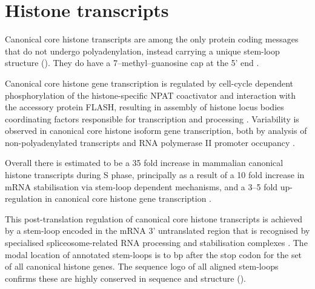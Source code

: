 \section{Histone transcripts}


  Canonical core histone transcripts are among the only protein coding messages
  that do not undergo polyadenylation,
  instead carrying a unique stem-loop structure ().
  They do have a 7--methyl--guanosine cap at the 5' end \citep{MarzluffNatRevGen2008}.

  Canonical core histone gene transcription is regulated
  by cell-cycle dependent phosphorylation of the histone-specific NPAT coactivator
  and interaction with the accessory protein FLASH,
  resulting in assembly of histone locus bodies
  coordinating factors responsible for transcription and processing
  \citep{MarzluffNatRevGen2008,RattrayMueller2012,Hoefig2014}.
  Variability is observed in canonical core histone isoform gene transcription,
  both by analysis of non-polyadenylated transcripts \citep{YangGenomeBiol2011}
  and RNA polymerase II promoter occupancy \citep{Ederveen2011}.

  Overall there is estimated to be a 35 fold increase in mammalian
  canonical histone transcripts during S phase,
  principally as a result of a 10 fold increase in mRNA stabilisation
  via stem-loop dependent mechanisms,
  and a 3--5 fold up-regulation in canonical core histone gene transcription \citep{HarrisMCB1991}.

  This post-translation regulation of canonical core histone transcripts
  is achieved by a stem-loop encoded in the mRNA 3' untranslated region
  that is recognised by specialised spliceosome-related RNA
  processing and stabilisation complexes \citep{stem-loop-structure}.
  The modal location of annotated stem-loops is \StemLoopStart{} to \StemLoopEnd{} bp after the stop codon
  for the set of all canonical histone genes.
  The sequence logo of all aligned stem-loops
  confirms these are highly conserved in sequence and structure ().

